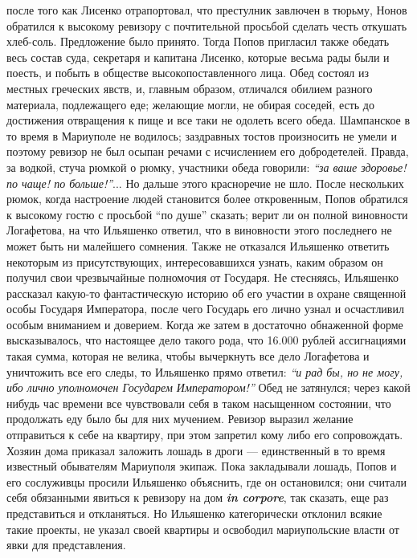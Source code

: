 \documentclass[a4paper,20pt]{article}
\begin{document}
после того как Лисенко отрапортовал, что престулник
завлючен в тюрьму, Нонов обратился к высокому ревизору с почтительной 
просьбой сделать честь откушать хлеб-соль. Предложение было принято. 
Тогда Попов пригласил
также обедать весь состав суда, секретаря и капитана
Лисенко, которые весьма рады были и поесть, и побыть в
обществе высокопоставленного лица. Обед состоял из местных греческих явств, и, главным образом, отличался
обилием разного материала, подлежащего еде; желающие
могли, не обирая соседей, есть до достижения отвращения к
пище и все таки не одолеть всего обеда. Шампанское в
то время в Мариуполе не водилось; заздравных тостов
произносить не умели и поэтому ревизор не был осыпан
речами с исчислением его добродетелей. Правда, за водкой,
стуча рюмкой о рюмку, участники обеда говорили: \emph{``за ваше
здоровье! по чаще! по больше!''}... Но дальше этого красноречие не шло.
После нескольких рюмок, когда настроение людей становится более откровенным, Попов обратился к
высокому гостю с просьбой ``по душе'' сказать; верит ли
он полной виновности Логафетова, на что Ильяшенко ответил, что в виновности этого последнего
не может быть ни малейшего сомнения. Также не отказался Ильяшенко ответить некоторым из 
присутствующих, интересовавшихся узнать, каким образом он получил свои чрезвычайные
полномочия от Государя. Не стесняясь, Ильяшенко рассказал 
какую-то фантастическую историю об его участии в
охране священной особы Государя Императора, после чего
Государь его лично узнал и осчастливил особым вниманием и доверием.
Когда же затем в достаточно обнаженной форме высказывалось, что настоящее дело такого рода,
что 16.000 рублей ассигнациями такая сумма, которая не
велика, чтобы вычеркнуть все дело Логафетова и уничтожить
все его следы, то Ильяшенко прямо ответил: \emph{``и рад бы,
но не могу, ибо лично уполномочен Государем Императором!''} Обед не затянулся; через какой нибудь час
времени все чувствовали себя в таком насыщенном состоянии,
что продолжать еду было бы для них мучением.
Ревизор выразил желание отправиться к себе на квартиру,
при этом запретил кому либо его сопровождать. Хозяин
дома приказал заложить лошадь в дроги — единственный
в то время известный обывателям Мариуполя экипаж.
Пока закладывали лошадь, Попов и его сослуживцы просили Ильяшенко 
объяснить, где он остановился; они считали себя обязанными явиться к ревизору на дом \textbf{\em in corpore},
так сказать, еще раз представиться и откланяться. Но
Ильяшенко категорически отклонил всякие такие проекты,
не указал своей квартиры и освободил мариупольские власти
от явки для представления.
\end{document}
